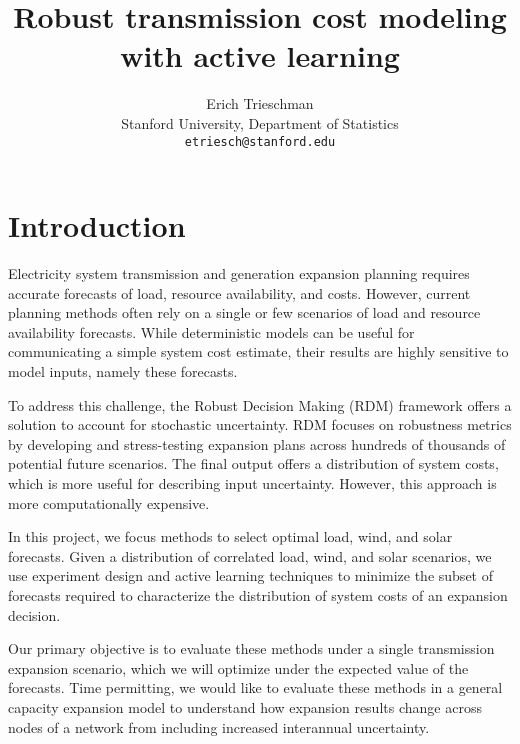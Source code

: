 \documentclass[10pt,twocolumn,letterpaper]{article}
\begin{document}
\title{Robust transmission cost modeling with active learning}

\author{Erich Trieschman\\
Stanford University, Department of Statistics\\
{\tt\small etriesch@stanford.edu}
}
\maketitle

  

\section{Introduction}
\label{sec:intro}

Electricity system transmission and generation expansion planning requires accurate forecasts of load, resource availability, and costs. However, current planning methods often rely on a single or few scenarios of load and resource availability forecasts. While deterministic models can be useful for communicating a simple system cost estimate, their results are highly sensitive to model inputs, namely these forecasts.

To address this challenge, the Robust Decision Making (RDM) framework offers a solution to account for stochastic uncertainty. RDM focuses on robustness metrics by developing and stress-testing expansion plans across hundreds of thousands of potential future scenarios. The final output offers a distribution of system costs, which is more useful for describing input uncertainty. However, this approach is more computationally expensive.

In this project, we focus methods to select optimal load, wind, and solar forecasts. Given a distribution of correlated load, wind, and solar scenarios, we use experiment design and active learning techniques to minimize the subset of forecasts required to characterize the distribution of system costs of an expansion decision.

Our primary objective is to evaluate these methods under a single transmission expansion scenario, which we will optimize under the expected value of the forecasts. Time permitting, we would like to evaluate these methods in a general capacity expansion model to understand how expansion results change across nodes of a network from including increased interannual uncertainty.
\end{document}

